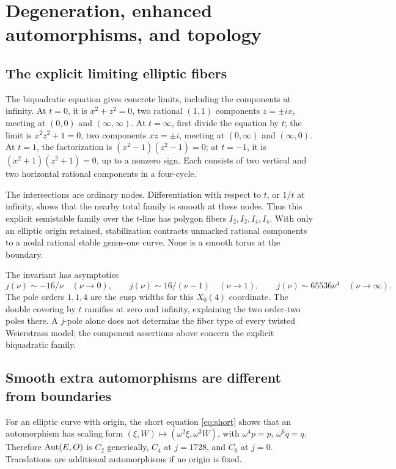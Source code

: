 \section{Degeneration, enhanced automorphisms, and topology}\label{sec:topology}

\subsection{The explicit limiting elliptic fibers}
The biquadratic equation gives concrete limits, including the components at infinity. At \(t=0\), it is \(x^2+z^2=0\), two rational \((1,1)\) components \(z=\pm ix\), meeting at \((0,0)\) and \((\infty,\infty)\). At \(t=\infty\), first divide the equation by \(t\); the limit is \(x^2z^2+1=0\), two components \(xz=\pm i\), meeting at \((0,\infty)\) and \((\infty,0)\). At \(t=1\), the factorization is \((x^2-1)(z^2-1)=0\); at \(t=-1\), it is \((x^2+1)(z^2+1)=0\), up to a nonzero sign. Each consists of two vertical and two horizontal rational components in a four-cycle.

The intersections are ordinary nodes. Differentiation with respect to \(t\), or \(1/t\) at infinity, shows that the nearby total family is smooth at these nodes. Thus this explicit semistable family over the \(t\)-line has polygon fibers \(I_2,I_2,I_4,I_4\). With only an elliptic origin retained, stabilization contracts unmarked rational components to a nodal rational stable genus-one curve. None is a smooth torus at the boundary.

The invariant has asymptotics
\[
j(\nu)\sim-16/\nu\quad(\nu\to0),\qquad
j(\nu)\sim16/(\nu-1)\quad(\nu\to1),\qquad
j(\nu)\sim65536\nu^4\quad(\nu\to\infty).
\]
The pole orders \(1,1,4\) are the cusp widths for this \(X_0(4)\) coordinate. The double covering by \(t\) ramifies at zero and infinity, explaining the two order-two poles there. A \(j\)-pole alone does not determine the fiber type of every twisted Weierstrass model; the component assertions above concern the explicit biquadratic family.

\subsection{Smooth extra automorphisms are different from boundaries}
For an elliptic curve with origin, the short equation \eqref{eq:short} shows that an automorphism has scaling form \((\xi,W)\mapsto(\omega^2\xi,\omega^3W)\), with \(\omega^4p=p\), \(\omega^6q=q\). Therefore \(\operatorname{Aut}(E,O)\) is \(C_2\) generically, \(C_4\) at \(j=1728\), and \(C_6\) at \(j=0\). Translations are additional automorphisms if no origin is fixed.

